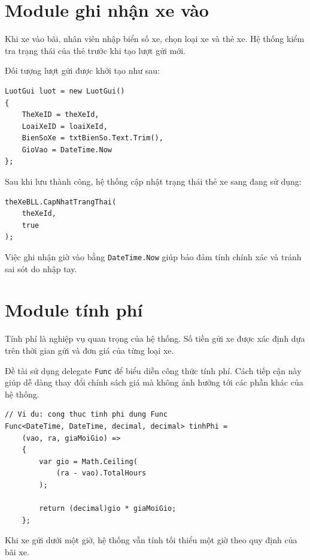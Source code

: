 \section{Module ghi nhận xe vào}

Khi xe vào bãi, nhân viên nhập biển số xe, chọn loại xe và thẻ xe.
Hệ thống kiểm tra trạng thái của thẻ trước khi tạo lượt gửi mới.

Đối tượng lượt gửi được khởi tạo như sau:

\begin{lstlisting}
LuotGui luot = new LuotGui()
{
    TheXeID = theXeId,
    LoaiXeID = loaiXeId,
    BienSoXe = txtBienSo.Text.Trim(),
    GioVao = DateTime.Now
};
\end{lstlisting}

Sau khi lưu thành công, hệ thống cập nhật trạng thái thẻ xe sang
đang sử dụng:

\begin{lstlisting}
theXeBLL.CapNhatTrangThai(
    theXeId,
    true
);
\end{lstlisting}

Việc ghi nhận giờ vào bằng \texttt{DateTime.Now} giúp bảo đảm tính
chính xác và tránh sai sót do nhập tay.

\section{Module tính phí}

Tính phí là nghiệp vụ quan trọng của hệ thống. Số tiền gửi xe được
xác định dựa trên thời gian gửi và đơn giá của từng loại xe.

Đề tài sử dụng delegate \texttt{Func} để biểu diễn công thức tính
phí. Cách tiếp cận này giúp dễ dàng thay đổi chính sách giá mà
không ảnh hưởng tới các phần khác của hệ thống.

\begin{lstlisting}
// Vi du: cong thuc tinh phi dung Func
Func<DateTime, DateTime, decimal, decimal> tinhPhi =
    (vao, ra, giaMoiGio) =>
    {
        var gio = Math.Ceiling(
            (ra - vao).TotalHours
        );

        return (decimal)gio * giaMoiGio;
    };
\end{lstlisting}

Khi xe gửi dưới một giờ, hệ thống vẫn tính tối thiểu một giờ theo
quy định của bãi xe.

